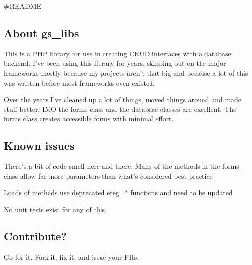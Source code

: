 \#\-R\-E\-A\-D\-M\-E

\subsection*{About gs\-\_\-libs}

This is a P\-H\-P library for use in creating C\-R\-U\-D interfaces with a database backend. I've been using this library for years, skipping out on the major frameworks mostly because my projects aren't that big and because a lot of this was written before most frameworks even existed.

Over the years I've cleaned up a lot of things, moved things around and made stuff better. I\-M\-O the forms class and the database classes are excellent. The forms class creates accessible forms with minimal effort.

\subsection*{Known issues}


\begin{DoxyItemize}
\item There's a bit of code smell here and there. Many of the methods in the forms class allow far more parameters than what's considered best practice
\item Loads of methods use deprecated ereg\-\_\-$\ast$ functions and need to be updated
\item No unit tests exist for any of this.
\end{DoxyItemize}

\subsection*{Contribute?}


\begin{DoxyItemize}
\item Go for it. Fork it, fix it, and issue your P\-Rs. 
\end{DoxyItemize}